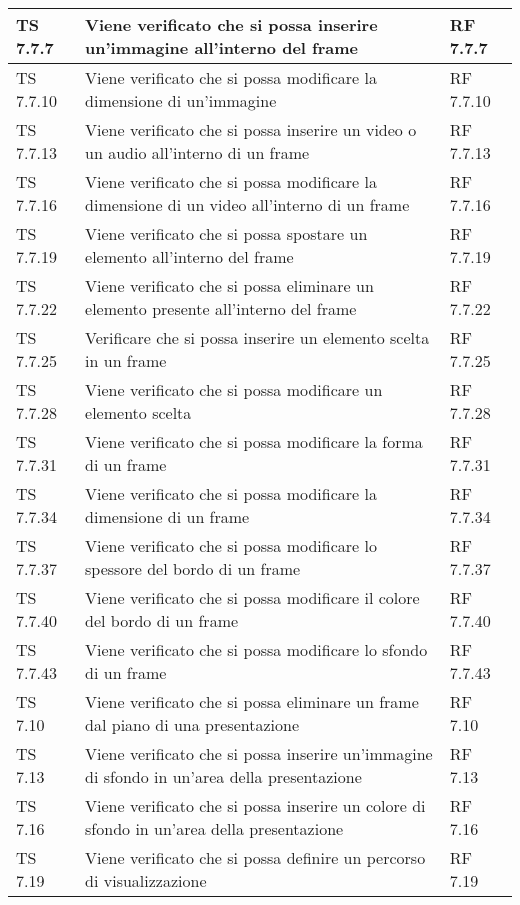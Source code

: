 {{\begin{longtable} [c]{| p{3cm} | p{6cm} |p{3cm}|}
			\hline
			TS 7.7.7 & Viene verificato che si possa inserire un'immagine all'interno del frame\ped{g} & RF 7.7.7\\
			\hline
			TS 7.7.10 & Viene verificato che si possa modificare la dimensione di un'immagine & RF 7.7.10\\
			\hline
			TS 7.7.13 & Viene verificato che si possa inserire un video o un audio all'interno di un frame\ped{g} & RF 7.7.13\\
			\hline
			TS 7.7.16 & Viene verificato che si possa modificare la dimensione di un video all'interno di un frame\ped{g} & RF 7.7.16\\
			\hline
			TS 7.7.19 & Viene verificato che si possa spostare un elemento all'interno del frame\ped{g} & RF 7.7.19\\
			\hline
			TS 7.7.22 & Viene verificato che si possa eliminare un elemento presente all'interno del frame\ped{g} & RF 7.7.22 \\
			\hline
			TS 7.7.25 & Verificare che si possa inserire un elemento scelta\ped{g} in un frame & RF 7.7.25\\
			\hline
			TS 7.7.28 & Viene verificato che si possa modificare un elemento scelta & RF 7.7.28\\
			\hline
			TS 7.7.31 & Viene verificato che si possa modificare la forma di un frame\ped{g} & RF 7.7.31\\
			\hline
			TS 7.7.34 & Viene verificato che si possa modificare la dimensione di un frame & RF 7.7.34\\
			\hline
			TS 7.7.37 & Viene verificato che si possa modificare  lo spessore del bordo di un frame\ped{g} & RF 7.7.37\\
			\hline
			TS 7.7.40 & Viene verificato che si possa modificare il colore del bordo di un frame\ped{g} & RF 7.7.40\\
			\hline
			TS 7.7.43 & Viene verificato che si possa modificare lo sfondo di un frame\ped{g} & RF 7.7.43\\
			\hline
			TS 7.10 & Viene verificato che si possa eliminare un frame\ped{g} dal piano di una presentazione & RF 7.10\\
			\hline
			TS 7.13 & Viene verificato che si possa inserire un'immagine di sfondo in un'area della presentazione & RF 7.13 \\
			\hline
			TS 7.16 & Viene verificato che si possa inserire un colore di sfondo in un'area della presentazione & RF 7.16\\
			\hline
			TS 7.19 & Viene verificato che si possa definire un percorso\ped{g} di visualizzazione & RF 7.19\\

\end{longtable}}}
